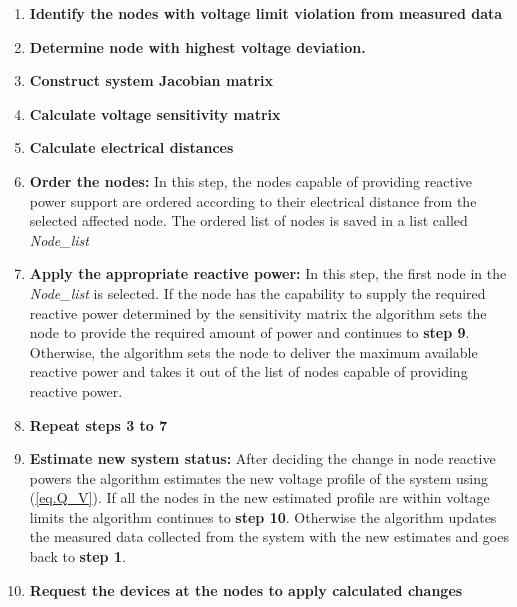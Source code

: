 \begin{enumerate}
\item \textbf{Identify the nodes with voltage limit violation from measured data}
\item \textbf{Determine node with highest voltage deviation.}
\item \textbf{Construct system Jacobian matrix}
\item \textbf{Calculate voltage sensitivity matrix}
\item \textbf{Calculate electrical distances}
\item \textbf{Order the nodes:} In this step, the nodes capable of providing reactive power support are ordered according to their electrical distance from the selected affected node. The ordered list of nodes is saved in a list called \textit{Node\_list}
\item \textbf{Apply the appropriate reactive power:} In this step, the first node in the \textit{Node\_list} is selected. If the node has the capability to supply the required reactive power determined by the sensitivity matrix the algorithm sets the node to provide the required amount of power and continues to \textbf{step 9}. Otherwise, the algorithm sets the node to deliver the maximum available reactive power and takes it out of the list of nodes capable of providing reactive power.
\item \textbf{Repeat steps 3 to 7}
\item \textbf{Estimate new system status:} After deciding the change in node reactive powers the algorithm estimates the new voltage profile of the system using (\ref{eq.Q_V}). If all the nodes in the new estimated profile are within voltage limits the algorithm continues to \textbf{step 10}. Otherwise the algorithm updates the measured data collected from the system with the new estimates and goes back to  \textbf{step 1}.

\item \textbf{Request the devices at the nodes to apply calculated changes}
\end{enumerate}